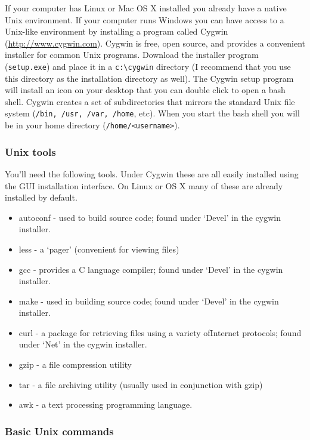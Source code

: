 If your computer has Linux or Mac OS X installed you already have a native Unix environment.  If your computer runs Windows you can have access to a Unix-like environment by installing a program called Cygwin (\href{http://www.cygwin.com}{http://www.cygwin.com}).  Cygwin is free, open source, and provides a convenient installer for common Unix programs.  Download the installer program (\verb=setup.exe=) and place it in a \verb=c:\cygwin= directory (I recommend that you use this directory as the installation directory as well).  The Cygwin setup program will install an icon on your desktop that you can double click to open a bash shell. Cygwin creates a set of subdirectories that mirrors the standard Unix file system (\verb=/bin, /usr, /var, /home=, etc). When you start the bash shell you will be in your home directory (\verb=/home/<username>=).

\subsubsection{Unix tools}

You'll need the following tools. Under Cygwin these are all easily installed using the GUI installation interface. On Linux or OS X many of these are already installed by default.

\begin{itemize}
    \item autoconf - used to build source code; found under `Devel' in the cygwin installer.
    \item less - a `pager' (convenient for viewing files)
    \item gcc - provides a C language compiler; found under `Devel' in the cygwin installer.
    \item make - used in building source code; found under `Devel' in the cygwin installer.
    \item curl - a package for retrieving files using a variety ofInternet protocols; found under `Net' in the cygwin installer.
    \item gzip - a file compression utility
    \item tar - a file archiving utility (usually used in conjunction with gzip)
    \item awk - a text processing programming language.
\end{itemize}

\subsubsection{Basic Unix commands}


